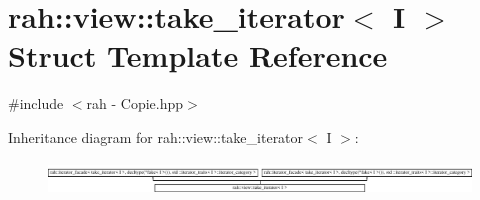 \hypertarget{structrah_1_1view_1_1take__iterator}{}\section{rah\+::view\+::take\+\_\+iterator$<$ I $>$ Struct Template Reference}
\label{structrah_1_1view_1_1take__iterator}


{\ttfamily \#include $<$rah -\/ Copie.\+hpp$>$}

Inheritance diagram for rah\+::view\+::take\+\_\+iterator$<$ I $>$\+:\begin{figure}[H]
\begin{center}
\leavevmode
\includegraphics[height=0.898876cm]{structrah_1_1view_1_1take__iterator}
\end{center}
\end{figure}
